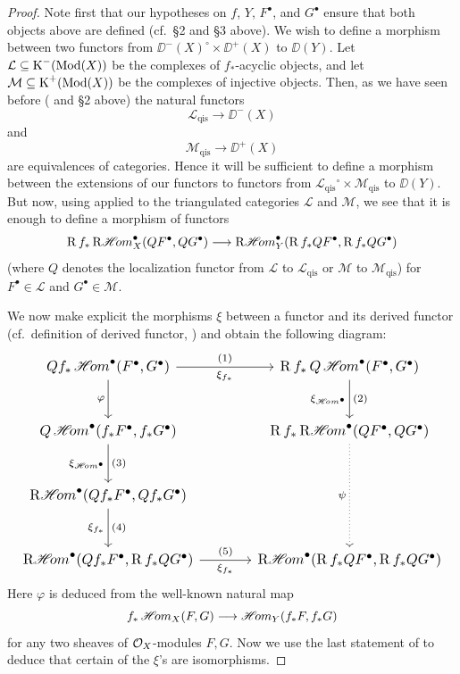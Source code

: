 \begin{proof}
Note first that our hypotheses on $f$, $Y$, $F^\bullet$, and $G^\bullet$ ensure that both objects above are defined (cf.\ \S2 and \S3 above). We wish to define a morphism between two functors from $\DD^-(X)^\circ\times\DD^+(X)$ to $\DD(Y)$. Let $\mathcal{L}\subseteq\operatorname{K}^-(\operatorname{Mod}(X))$ be the complexes of $f_*$-acyclic objects, and let $\mathcal{M}\subseteq\operatorname{K}^+(\operatorname{Mod}(X))$ be the complexes of injective objects. Then, as we have seen before ( and \S2 above) the natural functors
\[
\mathcal{L}_{\mathrm{qis}} \longrightarrow \DD^-(X)
\]
and
\[
\mathcal{M}_{\mathrm{qis}} \longrightarrow \DD^+(X)
\]
are equivalences of categories. Hence it will be sufficient to define a morphism between the extensions of our functors to functors from $\mathcal{L}_{\mathrm{qis}}{}^\circ\times\mathcal{M}_{\mathrm{qis}}$ to $\DD(Y)$. But now, using  applied to the triangulated categories $\mathcal{L}$ and $\mathcal{M}$, we see that it is enough to define a morphism of functors
\[
\operatorname{R} f_* \mathop{\mathrm{R}\mathscr{H}\!om}\nolimits_X^\bullet(QF^\bullet, QG^\bullet) \longrightarrow \mathop{\mathrm{R}\mathscr{H}\!om}\nolimits_Y^\bullet(\operatorname{R} f_*QF^\bullet, \operatorname{R} f_*QG^\bullet)
\]
(where $Q$ denotes the localization functor from $\mathcal{L}$ to $\mathcal{L}_{\mathrm{qis}}$ or $\mathcal{M}$ to $\mathcal{M}_{\mathrm{qis}}$) for $F^\bullet\in\mathcal{L}$ and $G^\bullet\in\mathcal{M}$.

We now make explicit the morphisms $\xi$ between a functor and its derived functor (cf.\ definition of derived functor, ) and obtain the following diagram:
\[
\resizebox{\linewidth}{!}{\begin{tikzcd}[ampersand replacement=\&, row sep=large, column sep=large]
	Qf_* \sheafHom^\bullet(F^\bullet, G^\bullet)
	\arrow[r, "\xi_{f_*}"', "(1)"]
	\arrow[d, "\varphi"']
	\& \RR f_*\, Q\sheafHom^\bullet(F^\bullet, G^\bullet)
	\arrow[d, "(2)", "\xi_{\sheafHom^\bullet}"'] \\
	Q\sheafHom^\bullet(f_*F^\bullet, f_*G^\bullet)
	\arrow[d, "(3)", "\xi_{\sheafHom^\bullet}"']
	\& \RR f_* \RsheafHom^\bullet(QF^\bullet, QG^\bullet)
	\arrow[dd, dotted, "\psi"'] \\
	\RsheafHom^\bullet(Qf_*F^\bullet, Qf_*G^\bullet)
	\arrow[d, "(4)", "\xi_{f_*}"']
	\& \\
	\RsheafHom^\bullet(Qf_*F^\bullet, \RR f_*QG^\bullet)
	\arrow[r, "(5)", "\xi_{f_*}"']
	\& \RsheafHom^\bullet(\RR f_*QF^\bullet, \RR f_*QG^\bullet)
\end{tikzcd}}
\]
Here $\varphi$ is deduced from the well-known natural map
\[
f_* \mathop{\mathscr{H}\!om}\nolimits_X(F,G) \longrightarrow \mathop{\mathscr{H}\!om}\nolimits_Y(f_*F,f_*G)
\]
for any two sheaves of $\mathcal{O}_X$-modules $F,G$. Now we use the last statement of  to deduce that certain of the $\xi$'s are isomorphisms.


\end{proof}

